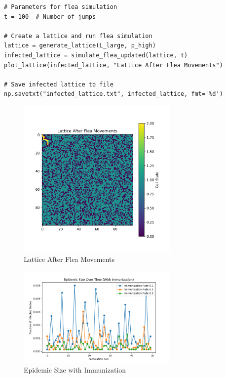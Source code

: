 \documentclass[10pt,letterpaper, onecolumn]{report}
\begin{document}
\begin{flushleft}
\begin{flushleft}
\begin{lstlisting}[style=myPythonStyle, caption={Flea on the very left dog}]
# Parameters for flea simulation
t = 100  # Number of jumps

# Create a lattice and run flea simulation
lattice = generate_lattice(L_large, p_high)
infected_lattice = simulate_flea_updated(lattice, t)
plot_lattice(infected_lattice, "Lattice After Flea Movements")

# Save infected lattice to file
np.savetxt("infected_lattice.txt", infected_lattice, fmt='%d')
                    \end{lstlisting}

\begin{figure}[htbp!]
    \centering
    \includegraphics[width=0.7\textwidth]{../Lattice After Flea Movements.png}
    \caption{Lattice After Flea Movements}
\end{figure}

\begin{figure}[htbp!]
    \centering
    \includegraphics[width=0.7\textwidth]{../epidemic_size_with_immunization.png}
    \caption{Epidemic Size with Immunization}
\end{figure}

    \end{flushleft}

\end{flushleft}
\end{document}
